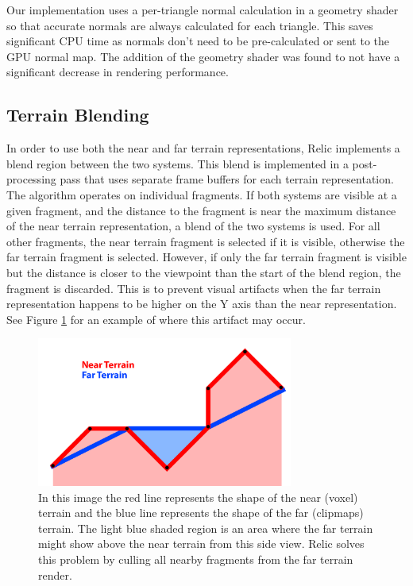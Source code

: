 Our implementation uses a per-triangle normal calculation in a geometry shader so that accurate normals are always calculated for each triangle.
This saves significant CPU time as normals don't need to be pre-calculated or sent to the GPU normal map.
The addition of the geometry shader was found to not have a significant decrease in rendering performance.

\subsection{Terrain Blending}

In order to use both the near and far terrain representations, Relic implements a blend region between the two systems.
This blend is implemented in a post-processing pass that uses separate frame buffers for each terrain representation.
The algorithm operates on individual fragments.
If both systems are visible at a given fragment, and the distance to the fragment is near the maximum distance of the near terrain representation, a blend of the two systems is used.
For all other fragments, the near terrain fragment is selected if it is visible, otherwise the far terrain fragment is selected.
However, if only the far terrain fragment is visible but the distance is closer to the viewpoint than the start of the blend region, the fragment is discarded.
This is to prevent visual artifacts when the far terrain representation happens to be higher on the Y axis than the near representation.
See Figure \ref{fig:terrain_overlap} for an example of where this artifact may occur.

\begin{figure}
	\centering
		\includegraphics[width=0.75\textwidth]{figures/terrain_overlap.png}
	\caption{
		In this image the red line represents the shape of the near (voxel) terrain and the blue line represents the shape of the far (clipmaps) terrain.
		The light blue shaded region is an area where the far terrain might show above the near terrain from this side view.
		Relic solves this problem by culling all nearby fragments from the far terrain render.
	}
	\label{fig:terrain_overlap}
\end{figure}


